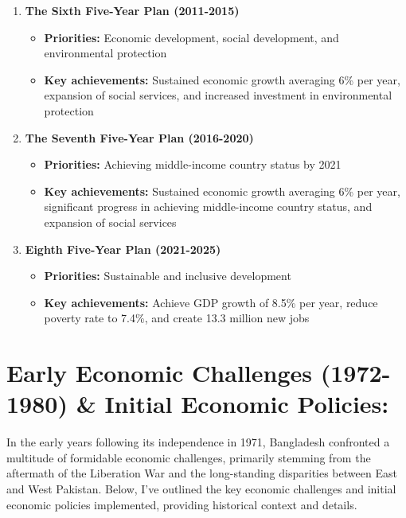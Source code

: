 \begin{enumerate}
	\item\textbf{The Sixth Five-Year Plan (2011-2015)}
	\begin{itemize}
		\item\textbf{Priorities:} Economic development, social development, and environmental protection
		\item\textbf{Key achievements:} Sustained economic growth averaging 6\% per year, expansion of 
		social services, and increased investment in environmental protection
	\end{itemize}
	
	\item\textbf{The Seventh Five-Year Plan (2016-2020)}
	\begin{itemize}
		\item\textbf{Priorities:} Achieving middle-income country status by 2021
		\item\textbf{Key achievements:} Sustained economic growth averaging 6\% per year, 
		significant progress in achieving middle-income country status, and expansion of social services
	\end{itemize}
	
	\item\textbf{Eighth Five-Year Plan (2021-2025)}
	\begin{itemize}
		\item\textbf{Priorities:} Sustainable and inclusive development
		\item\textbf{Key achievements:} Achieve GDP growth of 8.5\% per year, 
		reduce poverty rate to 7.4\%, and create 13.3 million new jobs
	\end{itemize}
	
\end{enumerate}


\section{Early Economic Challenges (1972-1980) \& Initial Economic Policies:}

In the early years following its independence in 1971, Bangladesh confronted a multitude 
of formidable economic challenges, primarily stemming from the aftermath of the Liberation War and 
the long-standing disparities between East and West Pakistan. Below, I've outlined the key economic 
challenges and initial economic policies implemented, providing historical context and details.

